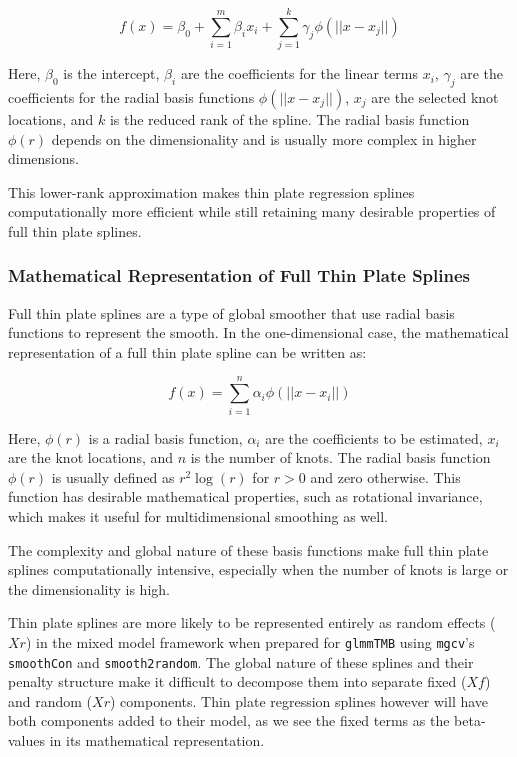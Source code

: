 \[
f(x) = \beta_0 + \sum_{i=1}^{m} \beta_i x_i + \sum_{j=1}^{k} \gamma_j \phi(|| x - x_{j} ||)
\]

Here, \( \beta_0 \) is the intercept, \( \beta_i \) are the coefficients for the linear terms \( x_i \), \( \gamma_j \) are the coefficients for the radial basis functions \( \phi(|| x - x_{j} ||) \), \( x_j \) are the selected knot locations, and \( k \) is the reduced rank of the spline. The radial basis function \( \phi(r) \) depends on the dimensionality and is usually more complex in higher dimensions.

This lower-rank approximation makes thin plate regression splines computationally more efficient while still retaining many desirable properties of full thin plate splines.


\subsubsection*{Mathematical Representation of Full Thin Plate Splines}

Full thin plate splines are a type of global smoother that use radial basis functions to represent the smooth. In the one-dimensional case, the mathematical representation of a full thin plate spline can be written as:

\[
f(x) = \sum_{i=1}^{n} \alpha_i \phi(|| x - x_i ||)
\]

Here, \( \phi(r) \) is a radial basis function, \( \alpha_i \) are the coefficients to be estimated, \( x_i \) are the knot locations, and \( n \) is the number of knots. The radial basis function \( \phi(r) \) is usually defined as \( r^2 \log(r) \) for \( r > 0 \) and zero otherwise. This function has desirable mathematical properties, such as rotational invariance, which makes it useful for multidimensional smoothing as well.

The complexity and global nature of these basis functions make full thin plate splines computationally intensive, especially when the number of knots is large or the dimensionality is high.



Thin plate splines are more likely to be represented entirely as random effects (\(Xr\)) in the mixed model framework when prepared for \texttt{glmmTMB} using \texttt{mgcv}'s \texttt{smoothCon} and \texttt{smooth2random}. The global nature of these splines and their penalty structure make it difficult to decompose them into separate fixed (\(Xf\)) and random (\(Xr\)) components. Thin plate regression splines however will have both components added to their model, as we see the fixed terms as the beta-values in its mathematical representation.


